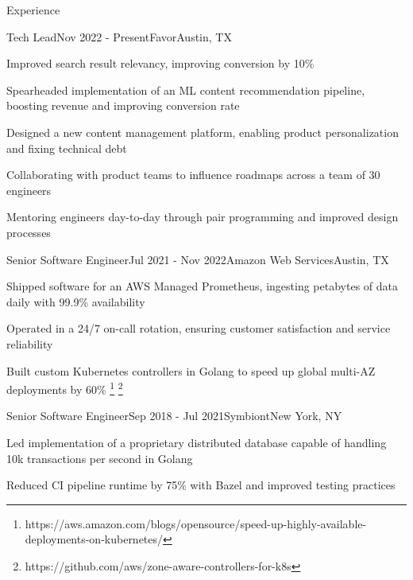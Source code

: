 \documentclass[
	10pt, %
]{resume} %
\begin{document}

\begin{rSection}{Experience}

	\begin{rSubsection}{Tech Lead}{Nov 2022 - Present}{Favor}{Austin, TX}
        \item Improved search result relevancy, improving conversion by 10\%
        \item Spearheaded implementation of an ML content recommendation pipeline, boosting revenue and improving conversion rate
        \item Designed a new content management platform, enabling product personalization and fixing technical debt
        \item Collaborating with product teams to influence roadmaps across a team of 30 engineers
        \item Mentoring engineers day-to-day through pair programming and improved design processes
	\end{rSubsection}


    \begin{rSubsection}{Senior Software Engineer}{Jul 2021 - Nov 2022}{Amazon Web Services}{Austin, TX}
        \item Shipped software for an AWS Managed Prometheus, ingesting petabytes of data daily with 99.9\% availability
        \item Operated in a 24/7 on-call rotation, ensuring customer satisfaction and service reliability
        \item Built custom Kubernetes controllers in Golang to speed up global multi-AZ deployments by 60\% \footnote{https://aws.amazon.com/blogs/opensource/speed-up-highly-available-deployments-on-kubernetes/} \footnote{https://github.com/aws/zone-aware-controllers-for-k8s}
    \end{rSubsection}
    

    \begin{rSubsection}{Senior Software Engineer}{Sep 2018 - Jul 2021}{Symbiont}{New York, NY}
        \item Led implementation of a proprietary distributed database capable of handling 10k transactions per second in Golang
        \item Reduced CI pipeline runtime by 75\% with Bazel and improved testing practices
    \end{rSubsection}


\end{rSection}
\end{document}
